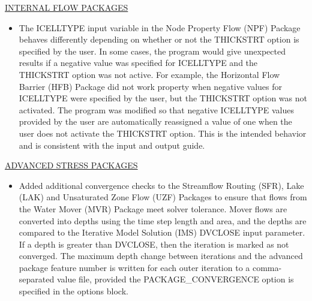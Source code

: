 	\underline{INTERNAL FLOW PACKAGES}
	\begin{itemize}
		\item The ICELLTYPE input variable in the Node Property Flow (NPF) Package behaves differently depending on whether or not the THICKSTRT option is specified by the user.  In some cases, the program would give unexpected results if a negative value was specified for ICELLTYPE and the THICKSTRT option was not active.  For example, the Horizontal Flow Barrier (HFB) Package did not work property when negative values for ICELLTYPE were specified by the user, but the THICKSTRT option was not activated.  The program was modified so that negative ICELLTYPE values provided by the user are automatically reassigned a value of one when the user does not activate the THICKSTRT option.  This is the intended behavior and is consistent with the input and output guide.   
	\end{itemize}


	\underline{ADVANCED STRESS PACKAGES}
	\begin{itemize}
		\item Added additional convergence checks to the Streamflow Routing (SFR), Lake (LAK) and Unsaturated Zone Flow (UZF) Packages to ensure that flows from the Water Mover (MVR) Package meet solver tolerance.  Mover flows are converted into depths using the time step length and area, and the depths are compared to the Iterative Model Solution (IMS) DVCLOSE input parameter.  If a depth is greater than DVCLOSE, then the iteration is marked as not converged.  The maximum depth change between iterations and the advanced package feature number is written for each outer iteration to a comma-separated value file, provided the PACKAGE\_CONVERGENCE option is specified in the options block.
	\end{itemize}



